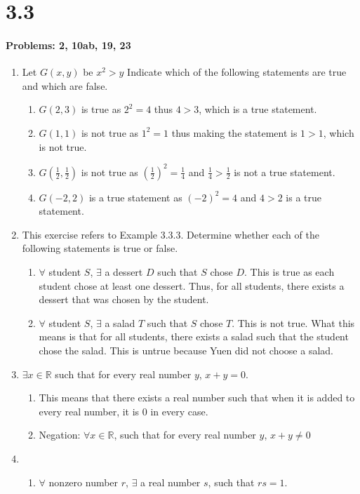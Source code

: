 \documentclass{article}
\makeatletter
\newcommand\setItemnumber[1]{\setcounter{enum\romannumeral\@enumdepth}{\numexpr#1-1\relax}}
\makeatother
\begin{document}
\section{3.3}
\paragraph{Problems: 2, 10ab, 19, 23}
\begin{enumerate}
    \setItemnumber{2}
    \item Let $G(x, y)$ be $x^2>y$ Indicate which of the following statements are true and which are false.
    \begin{enumerate}
        \item $G(2,3)$ is true as $2^2 =4$ thus $4>3$, which is a true statement.
        \item $G(1,1)$ is not true as $1^2 = 1$ thus making the statement is $1>1$, which is not true.
        \item $G(\frac{1}{2},\frac{1}{2})$ is not true as $(\frac{1}{2})^2=\frac{1}{4}$ and $\frac{1}{4}>\frac{1}{2}$ is not a true statement.
        \item $G(-2,2)$ is a true statement as $(-2)^2=4$ and $4>2$ is a true statement.
    \end{enumerate}
    \setItemnumber{10}
    \item This exercise refers to Example 3.3.3. Determine whether each of the following statements is true or false.
    \begin{enumerate}
        \item $\forall$ student $S$, $\exists$ a dessert $D$ such that $S$ chose $D$. This is true as each student chose at least one dessert. Thus, for all students, there exists a dessert that was chosen by the student.
        \item $\forall$ student $S$, $\exists$ a salad $T$ such that $S$ chose $T$. This is not true. What this means is that for all students, there exists a salad such that the student chose the salad. This is untrue because Yuen did not choose a salad.
    \end{enumerate}
    \setItemnumber{19}
    \item $\exists x\in\mathbb{R}$ such that for every real number $y$, $x+y=0$.
    \begin{enumerate}
        \item This means that there exists a real number such that when it is added to every real number, it is 0 in every case.
        \item Negation: $\forall x \in\mathbb{R}$,  such that for every real number $y$, $x+y\neq0$
    \end{enumerate}
    \setItemnumber{23}
    \item 
    \begin{enumerate}
        \item $\forall$ nonzero number $r$, $\exists$ a real number $s$, such that $rs = 1$. 
        

\end{enumerate}
\end{enumerate}
\end{document}
